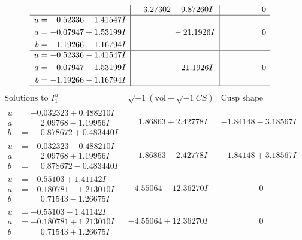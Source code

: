 \documentclass[1p]{elsarticle_modified}
\theoremstyle{definition}
\newcommand{\I}{\sqrt{-1}}
\begin{document}
$$\begin{array}{c|c|c}
 & -3.27302 + 9.87260 I & \phantom{-0.000000 } 0 \\ \hline\begin{aligned}
u &= -0.52336 + 1.41547 I \\
a &= -0.07947 + 1.53199 I \\
b &= -1.19266 + 1.16794 I\end{aligned}
 & \phantom{-0.000000 } -21.1926 I & \phantom{-0.000000 } 0 \\ \hline\begin{aligned}
u &= -0.52336 - 1.41547 I \\
a &= -0.07947 - 1.53199 I \\
b &= -1.19266 - 1.16794 I\end{aligned}
 & \phantom{-0.000000 -}21.1926 I & \phantom{-0.000000 } 0\\
 \hline 
 \end{array}$$\newpage$$\begin{array}{c|c|c}  
\text{Solutions to }I^u_{1}& \I (\text{vol} + \sqrt{-1}CS) & \text{Cusp shape}\\
 \hline 
\begin{aligned}
u &= -0.032323 + 0.488210 I \\
a &= \phantom{-}2.09768 - 1.19956 I \\
b &= \phantom{-}0.878672 + 0.483440 I\end{aligned}
 & \phantom{-}1.86863 + 2.42778 I & -1.84148 - 3.18567 I \\ \hline\begin{aligned}
u &= -0.032323 - 0.488210 I \\
a &= \phantom{-}2.09768 + 1.19956 I \\
b &= \phantom{-}0.878672 - 0.483440 I\end{aligned}
 & \phantom{-}1.86863 - 2.42778 I & -1.84148 + 3.18567 I \\ \hline\begin{aligned}
u &= -0.55103 + 1.41142 I \\
a &= -0.180781 - 1.213010 I \\
b &= \phantom{-}0.71543 - 1.26675 I\end{aligned}
 & -4.55064 - 12.36270 I & \phantom{-0.000000 } 0 \\ \hline\begin{aligned}
u &= -0.55103 - 1.41142 I \\
a &= -0.180781 + 1.213010 I \\
b &= \phantom{-}0.71543 + 1.26675 I\end{aligned}
 & -4.55064 + 12.36270 I & \phantom{-0.000000 } 0 \\ \hline\begin{aligned}

\end{aligned}
\end{array}$$
\end{document}
